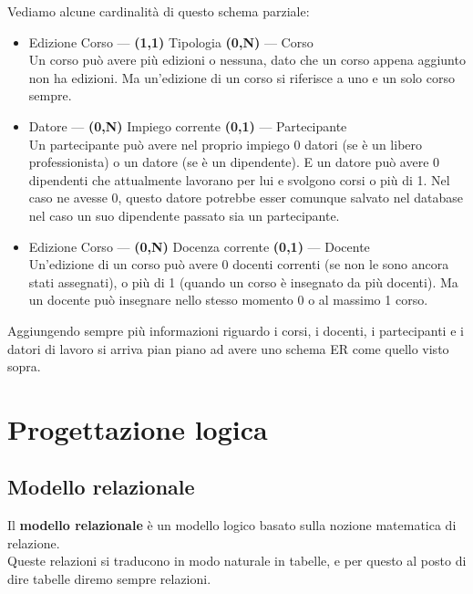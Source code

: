 \documentclass[11pt, a4paper, titlepage, oneside]{scrbook}
\begin{document}
Vediamo alcune cardinalità di questo schema parziale:

\begin{itemize}
    \item Edizione Corso --- \textbf{(1,1)} Tipologia \textbf{(0,N)} ---  Corso \\
    Un corso può avere più edizioni o nessuna, dato che un corso appena aggiunto non ha edizioni. Ma un'edizione di un corso si riferisce a uno e un solo corso sempre.
    \item Datore --- \textbf{(0,N)} Impiego corrente \textbf{(0,1)} --- Partecipante \\
    Un partecipante può avere nel proprio impiego 0 datori (se è un libero professionista) o un datore (se è un dipendente). E un datore può avere 0 dipendenti che attualmente lavorano per lui e svolgono corsi o più di 1. Nel caso ne avesse 0, questo datore potrebbe esser comunque salvato nel database nel caso un suo dipendente passato sia un partecipante.
    \item Edizione Corso --- \textbf{(0,N)} Docenza corrente \textbf{(0,1)} --- Docente \\
    Un'edizione di un corso può avere 0 docenti correnti (se non le sono ancora stati assegnati), o più di 1 (quando un corso è insegnato da più docenti). Ma un docente può insegnare nello stesso momento 0 o al massimo 1 corso.
\end{itemize}

Aggiungendo sempre più informazioni riguardo i corsi, i docenti, i partecipanti e i datori di lavoro si arriva pian piano ad avere uno schema ER come quello visto sopra.

\chapter{Progettazione logica}

\section{Modello relazionale}

\begin{Definizione}
\label{def-modello-relazionale-2}
Il \textbf{modello relazionale} è un modello logico basato sulla nozione matematica di relazione. \\
\NB Queste relazioni si traducono in modo naturale in tabelle, e per questo al posto di dire tabelle diremo sempre relazioni.
\end{Definizione}
\end{document}
